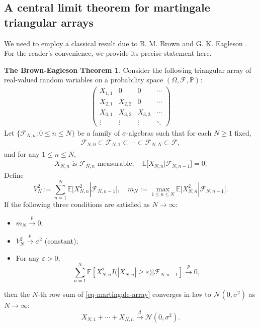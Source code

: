 \documentclass[11pt, reqno]{amsart}
\theoremstyle{definition}
\newtheorem*{Brown-Eagleson Theorem}{The Brown-Eagleson Theorem}
\newcommand{\E}{\mathbb E}
\newcommand{\cal}{\mathcal}
\begin{document}
	\subsection{A central limit theorem for martingale triangular arrays}

	 We need to employ a classical result due to B. M. Brown and G. K. Eagleson \cite[Corollary 1]{BE71}. For the reader's convenience, we provide its precise statement here.

	\begin{Brown-Eagleson Theorem}\label{thm-BE71}
		Consider the following triangular array of real-valued random variables on a probability space $(\Omega, \cal F, \mathbb P)$:
		\begin{align}\label{eq-martingale-array}
		\begin{pmatrix}
 			X_{1,1} & 0 & 0 & \cdots \\
			X_{2,1} & X_{2,2} & 0 & \cdots \\
			X_{3,1} & X_{3,2} & X_{3,3} & \cdots \\
			\vdots & \vdots & \vdots & \ddots
		\end{pmatrix}
	\end{align}
		Let $\{\mathcal{F}_{N,n}: 0\leq n \leq N\}$ be a family of $\sigma$-algebras such that for each $N\geq 1$ fixed, 
		\begin{align}\label{eq-condition-incresing-chain}
			\cal F_{N,0} \subset \cal F_{N,1} \subset \cdots \subset \cal F_{N,N} \subset \cal F, 
		\end{align} 
		and for any $1\leq n\leq N$, 
		\begin{align}\label{eq-condition-martingale} 
			X_{N,n} \text{ is $\cal F_{N,n}$-measurable}, \quad \E\big[ X_{N,n} | \cal F_{N,n-1}\big]=0.
		\end{align}
		Define
		$$
			V^2_N:= \sum_{n=1}^N \E\big[X_{N,n}^2| \cal F_{N,n-1}\big],\quad  m_N:= \max_{1\leq n\leq N} \E\big[X_{N,n}^2| \cal F_{N,n-1}\big].
		$$ 
		If the following three conditions are satisfied as $N\to \infty$: 
		\begin{itemize}
			\item [(C1)] $m_N \stackrel{p}{\longrightarrow} 0$;
			\item [(C2)] $V^2_N \stackrel{p}{\longrightarrow} \sigma^2$ (constant);
			\item [(C3)] For any $\varepsilon>0$, $$\sum_{n=1}^N \E[X_{N,n}^2 I\big(|X_{N,n}| \geq \varepsilon\big)| \cal F_{N,n-1}] \stackrel{p}{\longrightarrow}  0,$$
		\end{itemize}
		 then the $N$-th row sum of \eqref{eq-martingale-array} converges in law to $\cal N(0,\sigma^2)$ as $N\to \infty$: $$X_{N,1}+ \cdots + X_{N,n}\stackrel{d}{\longrightarrow} \cal N(0,\sigma^2).$$
	\end{Brown-Eagleson Theorem}
\end{document}
